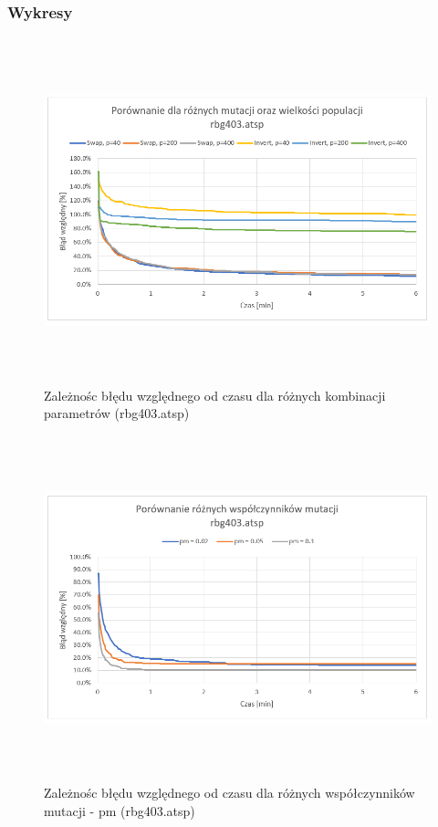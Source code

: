 \documentclass[a4paper,11pt]{article}
\begin{document}
\newpage
\subsubsection{Wykresy}

\begin{figure}[H]
\centering
\includegraphics[height=10cm]{w2.PNG}
\caption{Zależnośc błędu względnego od czasu dla różnych kombinacji parametrów (rbg403.atsp)}
\end{figure}

\begin{figure}[H]
\centering
\includegraphics[height=10cm]{w5.PNG}
\caption{Zależnośc błędu względnego od czasu dla różnych współczynników mutacji - pm (rbg403.atsp)}
\end{figure}
\end{document}
